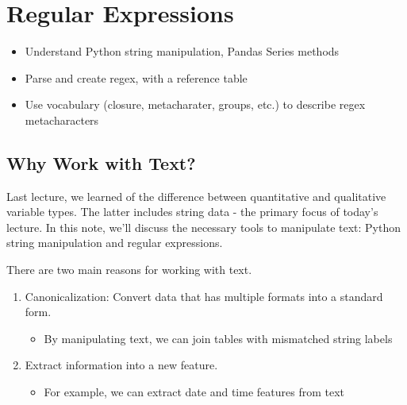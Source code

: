 \documentclass[
  letterpaper,
  DIV=11,
  numbers=noendperiod]{scrreprt}
\providecommand{\tightlist}{%
  \setlength{\itemsep}{0pt}\setlength{\parskip}{0pt}}\usepackage{longtable,booktabs,array}
\begin{document}

\hypertarget{regular-expressions}{%
\chapter{Regular Expressions}\label{regular-expressions}}

\begin{tcolorbox}[enhanced jigsaw, rightrule=.15mm, opacityback=0, colbacktitle=quarto-callout-note-color!10!white, opacitybacktitle=0.6, coltitle=black, toptitle=1mm, colback=white, toprule=.15mm, leftrule=.75mm, breakable, bottomtitle=1mm, bottomrule=.15mm, arc=.35mm, title=\textcolor{quarto-callout-note-color}{\faInfo}\hspace{0.5em}{Note}, colframe=quarto-callout-note-color-frame, titlerule=0mm, left=2mm]

\begin{itemize}
\tightlist
\item
  Understand Python string manipulation, Pandas Series methods
\item
  Parse and create regex, with a reference table
\item
  Use vocabulary (closure, metacharater, groups, etc.) to describe regex
  metacharacters
\end{itemize}

\end{tcolorbox}

\hypertarget{why-work-with-text}{%
\section{Why Work with Text?}\label{why-work-with-text}}

Last lecture, we learned of the difference between quantitative and
qualitative variable types. The latter includes string data - the
primary focus of today's lecture. In this note, we'll discuss the
necessary tools to manipulate text: Python string manipulation and
regular expressions.

There are two main reasons for working with text.

\begin{enumerate}
\def\labelenumi{\arabic{enumi}.}
\tightlist
\item
  Canonicalization: Convert data that has multiple formats into a
  standard form.

  \begin{itemize}
  \tightlist
  \item
    By manipulating text, we can join tables with mismatched string
    labels
  \end{itemize}
\item
  Extract information into a new feature.

  \begin{itemize}
  \tightlist
  \item
    For example, we can extract date and time features from text
  \end{itemize}
\end{enumerate}
\end{document}

